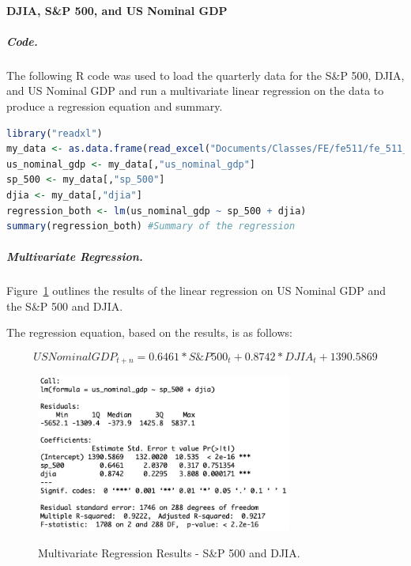 \documentclass[11pt]{article}
\numberwithin{equation}{section}
\begin{document}
\paragraph{DJIA, S\&P 500, and US Nominal GDP}

\subparagraph{Code.}
The following R code was used to load the quarterly data for the S\&P 500, DJIA, and US Nominal GDP and run a multivariate linear regression on the data to produce a regression equation and summary.

\vspace{3mm}
\begin{lstlisting}[language=R]
library("readxl")
my_data <- as.data.frame(read_excel("Documents/Classes/FE/fe511/fe_511_final_project/fe_511_data.xlsx"))
us_nominal_gdp <- my_data[,"us_nominal_gdp"]
sp_500 <- my_data[,"sp_500"]
djia <- my_data[,"djia"]
regression_both <- lm(us_nominal_gdp ~ sp_500 + djia)
summary(regression_both) #Summary of the regression
\end{lstlisting}
\vspace{3mm}

\subparagraph{Multivariate Regression.}
Figure~\ref{fig:model3} outlines the results of the linear regression on US Nominal GDP and the S\&P 500 and DJIA.

The regression equation, based on the results, is as follows:

\[ US Nominal GDP_{t+n} = 0.6461*S\&P500_{t} + 0.8742*DJIA_{t} + 1390.5869 \]

\begin{figure}
	\begin{center}
		{\includegraphics[width=0.75\textwidth]{regression_results_both.png}}
	\end{center}
	\caption{Multivariate Regression Results - S\&P 500 and DJIA.}
	\label{fig:model3}
\end{figure}
\end{document}
